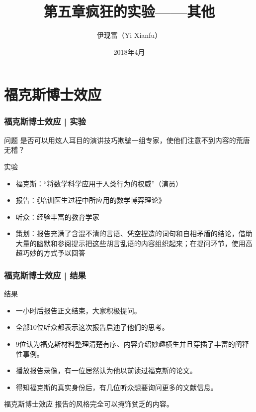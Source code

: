 



\title[其他]{第五章\quad 疯狂的实验——其他}
\author[Yixf]{伊现富（Yi Xianfu）}
\date{2018年4月}



\section{福克斯博士效应}
\begin{frame}
  \frametitle{福克斯博士效应 | 实验}
  \begin{block}{问题}
 是否可以用炫人耳目的演讲技巧欺骗一组专家，使他们注意不到内容的荒唐无稽？ 
  \end{block}
  \pause
  \begin{block}{实验}
    \begin{itemize}
      \item 福克斯：“将数学科学应用于人类行为的权威”（演员）
      \item 报告：《培训医生过程中所应用的数学博弈理论》
      \item 听众：经验丰富的教育学家
      \item 策划：报告充满了含混不清的言语、凭空捏造的词句和自相矛盾的结论，借助大量的幽默和参阅提示把这些胡言乱语的内容组织起来；在提问环节，使用高超巧妙的方式予以回答
    \end{itemize}
  \end{block}
\end{frame}

\begin{frame}
  \frametitle{福克斯博士效应 | 结果}
  \begin{block}{结果}
    \begin{itemize}
      \item 一小时后报告正文结束，大家积极提问。
      \item 全部10位听众都表示这次报告启迪了他们的思考。
      \item 9位认为福克斯材料整理清楚有序、内容介绍妙趣横生并且穿插了丰富的阐释性事例。
      \item 播放报告录像，有一位居然认为他以前读过福克斯的论文。
      \item 得知福克斯的真实身份后，有几位听众想要询问更多的文献信息。
    \end{itemize}
  \end{block}
  \pause
  \begin{block}{\alert{福克斯博士效应}}
    报告的风格完全可以掩饰贫乏的内容。
  \end{block}
\end{frame}

